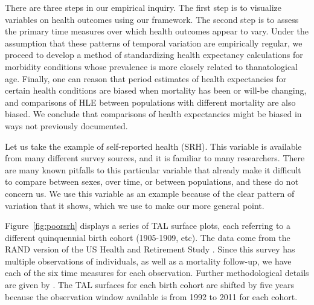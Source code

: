 \documentclass[12pt,oneside,a4paper]{article} %
\begin{document}
There are three steps in our empirical inquiry. The first step is to visualize
variables on health outcomes using our framework. The second step is to
assess the primary time measures over which health outcomes appear to vary.
Under the assumption that these patterns of temporal variation are empirically regular,
we proceed to develop a method of standardizing health expectancy calculations
for morbidity conditions whose prevalence is more closely related
to thanatological age.
Finally, one can reason that period estimates of health expectancies for certain
health conditions are biased when mortality has been or will-be changing, and
comparisons of HLE between populations with different mortality are also biased.
We conclude that comparisons of health expectancies might be biased in ways not
previously documented.

Let us take the example of self-reported health (SRH). This variable is
available from many different survey sources, and it is familiar to many researchers. There are
many known pitfalls to this particular variable that already make it difficult
to compare between sexes, over time, or between populations, and these do not
concern us. We use this variable as an example because of the clear
pattern of variation that it shows, which we use to make our more general point.

Figure~\ref{fig:poorsrh} displays a series of TAL surface plots, each referring
to a different quinquennial birth cohort (1905-1909, etc). The data come from
the RAND version of the US Health and Retirement Study \citep{HRS}. Since this
survey has multiple observations of individuals, as well as a mortality
follow-up, we have each of the six time measures for each observation. Further methodological details are given by \citet{riffe2015ttd}. The TAL surfaces for each birth
cohort are shifted by five years because the observation window available is
from 1992 to 2011 for each cohort.
\end{document}
